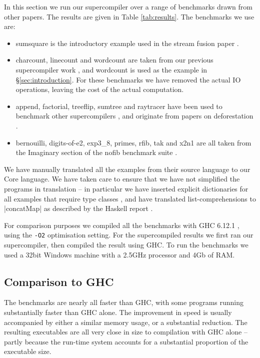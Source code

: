 \documentclass[draft]{sigplanconf}
\begin{document}
In this section we run our supercompiler over a range of benchmarks drawn from other papers. The results are given in Table \ref{tab:results}. The benchmarks we use are:

\begin{itemize}
\item sumsquare is the introductory example used in the stream fusion paper \cite{coutts:stream_fusion}.
\item charcount, linecount and wordcount are taken from our previous supercompiler work \cite{me:supero}, and wordcount is used as the example in \S\ref{sec:introduction}. For these benchmarks we have removed the actual IO operations, leaving the cost of the actual computation.
\item append, factorial, treeflip, sumtree and raytracer have been used to benchmark other supercompilers \cite{jonsson:supercompilation}, and originate from papers on deforestation \cite{wadler:deforestation,kort:raytracer}.
\item bernouilli, digits-of-e2, exp3\_8, primes, rfib, tak and x2n1 are all taken from the Imaginary section of the nofib benchmark suite \cite{nofib}.
\end{itemize}

We have manually translated all the examples from their source language to our Core language. We have taken care to ensure that we have not simplified the programs in translation -- in particular we have inserted explicit dictionaries for all examples that require type classes \cite{wadler:type_classes}, and have translated list-comprehensions to |concatMap| as described by the Haskell report \cite{haskell}.

For comparison purposes we compiled all the benchmarks with GHC 6.12.1 \cite{ghc6_12}, using the \texttt{-O2} optimisation setting. For the supercompiled results we first ran our supercompiler, then compiled the result using GHC. To run the benchmarks we used a 32bit Windows machine with a 2.5GHz processor and 4Gb of RAM.

\subsection{Comparison to GHC}

The benchmarks are nearly all faster than GHC, with some programs running substantially faster than GHC alone. The improvement in speed is usually accompanied by either a similar memory usage, or a substantial reduction. The resulting executables are all very close in size to compilation with GHC alone -- partly because the run-time system accounts for a substantial proportion of the executable size.
\end{document}
